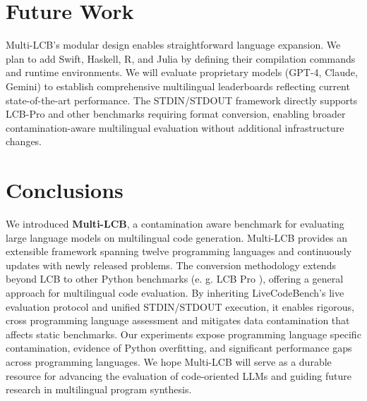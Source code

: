 \documentclass{article} %
\begin{document}
\section{Future Work}

Multi-LCB's modular design enables straightforward language expansion. We plan to add Swift, Haskell, R, and Julia by defining their compilation commands and runtime environments. %
We will evaluate proprietary models (GPT-4, Claude, Gemini) to establish comprehensive multilingual leaderboards reflecting current state-of-the-art performance. The STDIN/STDOUT framework directly supports LCB-Pro \citep{zheng2025livecodebench} and other benchmarks requiring format conversion, enabling broader contamination-aware multilingual evaluation without additional infrastructure changes.


\section{Conclusions}

We introduced \textbf{Multi-LCB}, a contamination aware benchmark for evaluating large language models on multilingual code generation. Multi-LCB provides an extensible framework spanning twelve programming languages and continuously updates with newly released problems. The conversion methodology extends beyond LCB to other Python benchmarks (e. g. LCB Pro \citep{zheng2025livecodebench}), offering a general approach for multilingual code evaluation. By inheriting LiveCodeBench’s live evaluation protocol and unified STDIN/STDOUT execution, it enables rigorous, cross programming language assessment and mitigates data contamination that affects static benchmarks. Our experiments expose programming language specific contamination, evidence of Python overfitting, and significant performance gaps across programming languages.  
We hope Multi-LCB will serve as a durable resource for advancing the evaluation of code-oriented LLMs and guiding future research in multilingual program synthesis.






\clearpage
\appendix



\end{document}

